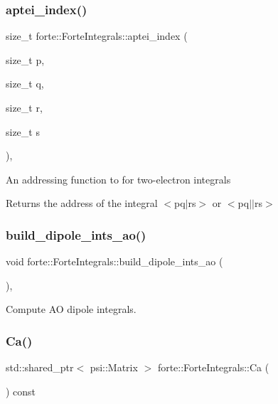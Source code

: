 \subsubsection{\texorpdfstring{aptei\+\_\+index()}{aptei\_index()}}
{\footnotesize\ttfamily size\+\_\+t forte\+::\+Forte\+Integrals\+::aptei\+\_\+index (\begin{DoxyParamCaption}\item[{size\+\_\+t}]{p,  }\item[{size\+\_\+t}]{q,  }\item[{size\+\_\+t}]{r,  }\item[{size\+\_\+t}]{s }\end{DoxyParamCaption})\hspace{0.3cm}{\ttfamily [inline]}, {\ttfamily [protected]}}

An addressing function to for two-\/electron integrals \begin{DoxyReturn}{Returns}
the address of the integral $<$pq$\vert$rs$>$ or $<$pq$\vert$$\vert$rs$>$ 
\end{DoxyReturn}
\mbox{\label{classforte_1_1_forte_integrals_a5b27ca75c026c350cdeb81fd64337c0c}} 
\subsubsection{\texorpdfstring{build\+\_\+dipole\+\_\+ints\+\_\+ao()}{build\_dipole\_ints\_ao()}}
{\footnotesize\ttfamily void forte\+::\+Forte\+Integrals\+::build\+\_\+dipole\+\_\+ints\+\_\+ao (\begin{DoxyParamCaption}{ }\end{DoxyParamCaption})\hspace{0.3cm}{\ttfamily [protected]}, {\ttfamily [virtual]}}



Compute AO dipole integrals. 

\mbox{\label{classforte_1_1_forte_integrals_a4607d886e1224bc0b0db9b9a5fe44edb}} 
\subsubsection{\texorpdfstring{Ca()}{Ca()}}
{\footnotesize\ttfamily std\+::shared\+\_\+ptr$<$ psi\+::\+Matrix $>$ forte\+::\+Forte\+Integrals\+::\+Ca (\begin{DoxyParamCaption}{ }\end{DoxyParamCaption}) const}



